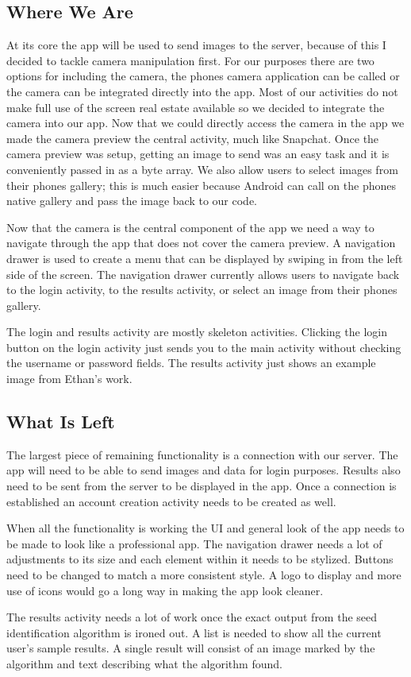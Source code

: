 \documentclass[onecolumn, draftclsnofoot,10pt, compsoc]{IEEEtran}
\begin{document}
	\subsection{Where We Are}
		At its core the app will be used to send images to the server, because of this I decided to tackle camera manipulation first.
		For our purposes there are two options for including the camera, the phones camera application can be called or the camera can be integrated directly into the app.
		Most of our activities do not make full use of the screen real estate available so we decided to integrate the camera into our app.
		Now that we could directly access the camera in the app we made the camera preview the central activity, much like Snapchat.
		Once the camera preview was setup, getting an image to send was an easy task and it is conveniently passed in as a byte array.
		We also allow users to select images from their phones gallery; this is much easier because Android can call on the phones native gallery and pass the image back to our code.

		Now that the camera is the central component of the app we need a way to navigate through the app that does not cover the camera preview.
		A navigation drawer is used to create a menu that can be displayed by swiping in from the left side of the screen.
		The navigation drawer currently allows users to navigate back to the login activity, to the results activity, or select an image from their phones gallery.

		The login and results activity are mostly skeleton activities.
		Clicking the login button on the login activity just sends you to the main activity without checking the username or password fields.
		The results activity just shows an example image from Ethan's work.

	\subsection{What Is Left}
		The largest piece of remaining functionality is a connection with our server.
		The app will need to be able to send images and data for login purposes.
		Results also need to be sent from the server to be displayed in the app.
		Once a connection is established an account creation activity needs to be created as well.

		When all the functionality is working the UI and general look of the app needs to be made to look like a professional app.
		The navigation drawer needs a lot of adjustments to its size and each element within it needs to be stylized.
		Buttons need to be changed to match a more consistent style.
		A logo to display and more use of icons would go a long way in making the app look cleaner.

		The results activity needs a lot of work once the exact output from the seed identification algorithm is ironed out.
		A list is needed to show all the current user's sample results.
		A single result will consist of an image marked by the algorithm and text describing what the algorithm found.



\end{document}
